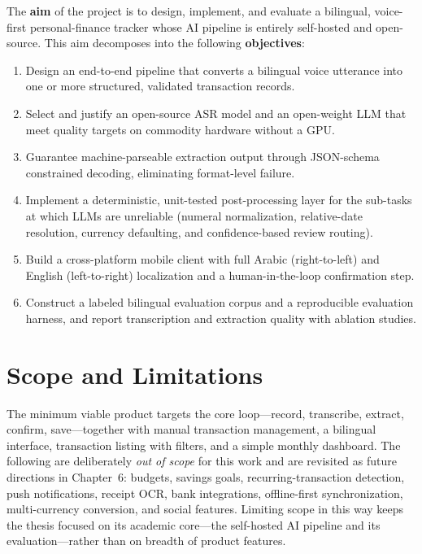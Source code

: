 The \textbf{aim} of the project is to design, implement, and evaluate a
bilingual, voice-first personal-finance tracker whose AI pipeline is entirely
self-hosted and open-source. This aim decomposes into the following
\textbf{objectives}:

\begin{enumerate}[label=\textbf{O\arabic*.}, leftmargin=*]
    \item Design an end-to-end pipeline that converts a bilingual voice utterance
    into one or more structured, validated transaction records.
    \item Select and justify an open-source ASR model and an open-weight LLM that
    meet quality targets on commodity hardware without a GPU.
    \item Guarantee machine-parseable extraction output through JSON-schema
    constrained decoding, eliminating format-level failure.
    \item Implement a deterministic, unit-tested post-processing layer for the
    sub-tasks at which LLMs are unreliable (numeral normalization, relative-date
    resolution, currency defaulting, and confidence-based review routing).
    \item Build a cross-platform mobile client with full Arabic (right-to-left)
    and English (left-to-right) localization and a human-in-the-loop confirmation
    step.
    \item Construct a labeled bilingual evaluation corpus and a reproducible
    evaluation harness, and report transcription and extraction quality with
    ablation studies.
\end{enumerate}

\section{Scope and Limitations}

The minimum viable product targets the core loop---record, transcribe, extract,
confirm, save---together with manual transaction management, a bilingual
interface, transaction listing with filters, and a simple monthly dashboard. The
following are deliberately \emph{out of scope} for this work and are revisited as
future directions in Chapter~6: budgets, savings goals, recurring-transaction
detection, push notifications, receipt OCR, bank integrations, offline-first
synchronization, multi-currency conversion, and social features. Limiting scope
in this way keeps the thesis focused on its academic core---the self-hosted AI
pipeline and its evaluation---rather than on breadth of product features.

